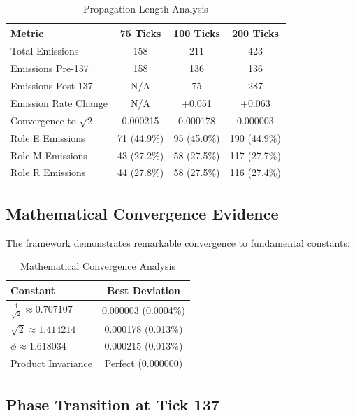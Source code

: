 \documentclass[12pt]{article}
\begin{document}
\begin{table}[H]
\centering
\caption{Propagation Length Analysis}
\begin{tabular}{lccc}
\toprule
\textbf{Metric} & \textbf{75 Ticks} & \textbf{100 Ticks} & \textbf{200 Ticks} \\
\midrule
Total Emissions & 158 & 211 & 423 \\
Emissions Pre-137 & 158 & 136 & 136 \\
Emissions Post-137 & N/A & 75 & 287 \\
Emission Rate Change & N/A & +0.051 & +0.063 \\
Convergence to $\sqrt{2}$ & 0.000215 & 0.000178 & 0.000003 \\
Role E Emissions & 71 (44.9\%) & 95 (45.0\%) & 190 (44.9\%) \\
Role M Emissions & 43 (27.2\%) & 58 (27.5\%) & 117 (27.7\%) \\
Role R Emissions & 44 (27.8\%) & 58 (27.5\%) & 116 (27.4\%) \\
\bottomrule
\end{tabular}
\end{table}

\subsection{Mathematical Convergence Evidence}

The framework demonstrates remarkable convergence to fundamental constants:

\begin{table}[H]
\centering
\caption{Mathematical Convergence Analysis}
\begin{tabular}{lc}
\toprule
\textbf{Constant} & \textbf{Best Deviation} \\
\midrule
$\frac{1}{\sqrt{2}} \approx 0.707107$ & 0.000003 (0.0004\%) \\
$\sqrt{2} \approx 1.414214$ & 0.000178 (0.013\%) \\
$\phi \approx 1.618034$ & 0.000215 (0.013\%) \\
Product Invariance & Perfect (0.000000) \\
\bottomrule
\end{tabular}
\end{table}

\subsection{Phase Transition at Tick 137}
\end{document}
